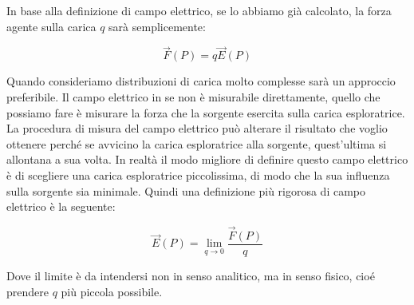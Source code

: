 \begin{figure}[htpb]
\end{figure}
\FloatBarrier

In base alla definizione di campo elettrico, se lo abbiamo già calcolato, la forza agente sulla carica $q$ sarà semplicemente:

\[
	\vec{F} (P) = q\vec{E} (P)
\]

Quando consideriamo distribuzioni di carica molto complesse sarà un approccio preferibile.
Il campo elettrico in se non è misurabile direttamente, quello che possiamo fare è misurare la forza che la sorgente esercita sulla carica esploratrice.
La procedura di misura del campo elettrico può alterare il risultato che voglio ottenere perché se avvicino la carica esploratrice alla sorgente, quest'ultima si allontana a sua volta. In realtà il modo migliore di definire questo campo elettrico è di scegliere una carica esploratrice piccolissima, di modo che la sua influenza sulla sorgente sia minimale. Quindi una definizione più rigorosa di campo elettrico è la seguente:

\[
	\vec{E} (P)=\lim_{q \to 0}\frac{\vec{F} (P)}{q}
\]

Dove il limite è da intendersi non in senso analitico, ma in senso fisico, cioé prendere $q$ più piccola possibile.

